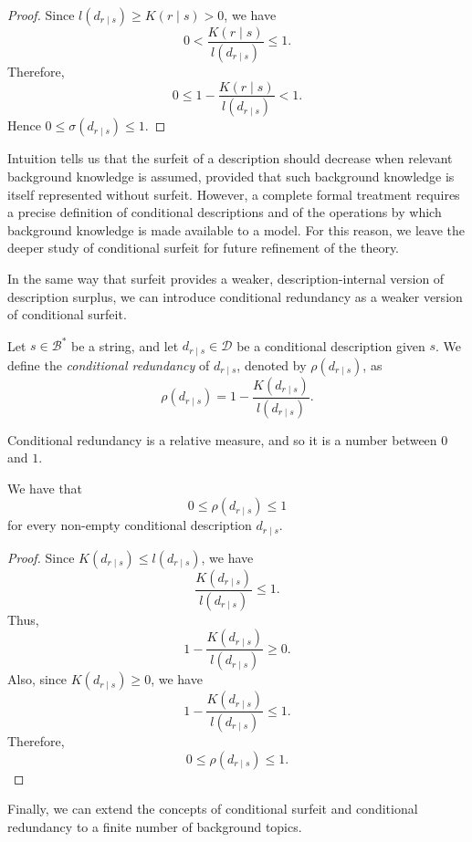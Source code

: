 \begin{proof}
Since \(l(d_{r\mid s})\geq K(r\mid s)>0\), we have
\[
0<\frac{K(r\mid s)}{l(d_{r\mid s})}\leq 1.
\]
Therefore,
\[
0\leq 1-\frac{K(r\mid s)}{l(d_{r\mid s})}<1.
\]
Hence \(0\leq \sigma(d_{r\mid s})\leq 1\).
\end{proof}

Intuition tells us that the surfeit of a description should decrease when relevant background knowledge is assumed, provided that such background knowledge is itself represented without surfeit. However, a complete formal treatment requires a precise definition of conditional descriptions and of the operations by which background knowledge is made available to a model. For this reason, we leave the deeper study of conditional surfeit for future refinement of the theory.

In the same way that surfeit provides a weaker, description-internal version of description surplus, we can introduce conditional redundancy as a weaker version of conditional surfeit.

\begin{definition}
Let \(s\in\mathcal B^\ast\) be a string, and let \(d_{r\mid s}\in\mathcal D\) be a conditional description given \(s\). We define the \emph{conditional redundancy} of \(d_{r\mid s}\), denoted by \(\rho(d_{r\mid s})\), as
\[
\rho(d_{r\mid s})
=
1-\frac{K(d_{r\mid s})}{l(d_{r\mid s})}.
\]
\end{definition}

Conditional redundancy is a relative measure, and so it is a number between \(0\) and \(1\).

\begin{proposition}
We have that
\[
0\leq \rho(d_{r\mid s})\leq 1
\]
for every non-empty conditional description \(d_{r\mid s}\).
\end{proposition}

\begin{proof}
Since \(K(d_{r\mid s})\leq l(d_{r\mid s})\), we have
\[
\frac{K(d_{r\mid s})}{l(d_{r\mid s})}\leq 1.
\]
Thus,
\[
1-\frac{K(d_{r\mid s})}{l(d_{r\mid s})}\geq 0.
\]
Also, since \(K(d_{r\mid s})\geq 0\), we have
\[
1-\frac{K(d_{r\mid s})}{l(d_{r\mid s})}\leq 1.
\]
Therefore,
\[
0\leq \rho(d_{r\mid s})\leq 1.
\]
\end{proof}

Finally, we can extend the concepts of conditional surfeit and conditional redundancy to a finite number of background topics.

